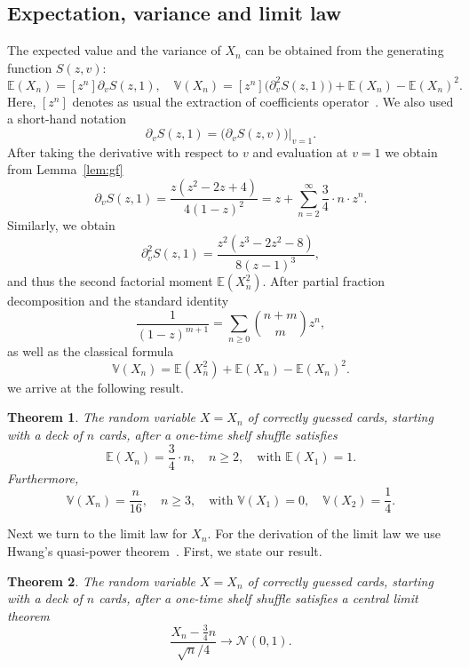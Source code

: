 \documentclass[10pt,reqno,a4paper]{amsart}
\newtheorem{theorem}{Theorem}
\theoremstyle{definition}
\def\E{{\mathbb {E}}}
\def\Var{{\mathbb {V}}}
\newcommand{\fallfak}[2]{\ensuremath{#1^{\underline{#2}}}}
\begin{document}
\subsection{Expectation, variance and limit law}
The expected value and the variance of $X_n$ can be obtained from the generating function $S(z,v)$:
\[
\E(X_n)=[z^n]\partial_v S(z,1),\quad \Var(X_n)=[z^n]\big(\partial_v^2 S(z,1)\big) +\E(X_n)-\E(X_n)^2.
\]
Here, $[z^n]$ denotes as usual the extraction of coefficients operator~\cite{FlaSed}.
We also used a short-hand notation
\[
\partial_v S(z,1)= \big(\partial_v S(z,v)\big)|_{v=1}.
\]
After taking the derivative with respect to $v$ and evaluation at $v=1$ we obtain from Lemma~\ref{lem:gf}
\[
\partial_v S(z,1)=\frac{z(z^2-2z+4)}{4(1-z)^2}=z+\sum_{n=2}^{\infty}\frac34\cdot n\cdot z^n.
\]
Similarly, we obtain
\[
\partial_v^2 S(z,1)=\frac{z^2(z^3-2z^2-8)}{8(z-1)^3},
\]
and thus the second factorial moment $\E(\fallfak{X_n}2)$. 
After partial fraction decomposition and the standard identity 
\[
\frac{1}{(1-z)^{m+1}}=\sum_{n\ge 0}\binom{n+m}{m}z^n,
\]
as well as the classical formula
\begin{equation}
\label{eqn:Var}
\Var(X_n)=\E(\fallfak{X_n}2)+\E(X_n)-\E(X_n)^2.
\end{equation}
we arrive at the following result. 
\begin{theorem}
The random variable $X=X_n$ of correctly guessed cards, starting with a deck of $n$ cards, after a one-time shelf shuffle satisfies
\[
\E(X_n)=\frac34\cdot n,\quad n\ge 2, \quad \text{with }\E(X_1)=1.
\]
Furthermore,
\[
\Var(X_n)=\frac{n}{16},\quad n\ge 3,\quad  \text{with }\Var(X_1)=0,\quad \Var(X_2)=\frac14.
\]
\end{theorem}

Next we turn to the limit law for $X_n$. For the derivation of the limit law we use Hwang's quasi-power theorem~\cite{Hwang1994,Hwang1998}.
First, we state our result. 
\begin{theorem}
\label{the:main}
The random variable $X=X_n$ of correctly guessed cards, starting with a deck of $n$ cards, after a one-time shelf shuffle satisfies
a central limit theorem
\[
\frac{X_n-\frac34 n}{\sqrt{n}/4}\to \mathcal{N}(0,1). 
\]
\end{theorem}
\end{document}
